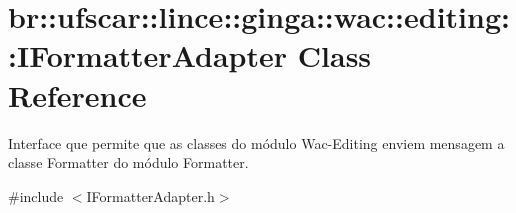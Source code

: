 \hypertarget{classbr_1_1ufscar_1_1lince_1_1ginga_1_1wac_1_1editing_1_1IFormatterAdapter}{
\section{br::ufscar::lince::ginga::wac::editing::IFormatterAdapter Class Reference}
\label{classbr_1_1ufscar_1_1lince_1_1ginga_1_1wac_1_1editing_1_1IFormatterAdapter}
}


Interface que permite que as classes do módulo Wac-\/Editing enviem mensagem a classe Formatter do módulo Formatter.  




{\ttfamily \#include $<$IFormatterAdapter.h$>$}

